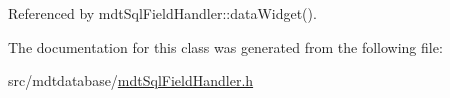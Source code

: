 Referenced by mdt\-Sql\-Field\-Handler\-::data\-Widget().



The documentation for this class was generated from the following file\-:\begin{DoxyCompactItemize}
\item 
src/mdtdatabase/\hyperlink{mdt_sql_field_handler_8h}{mdt\-Sql\-Field\-Handler.\-h}\end{DoxyCompactItemize}
